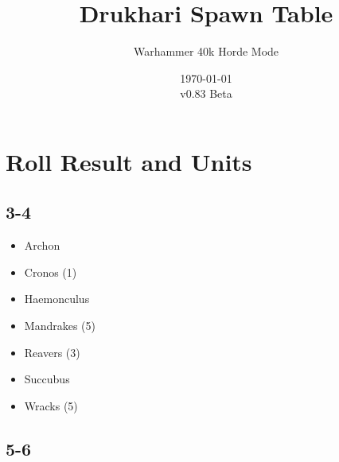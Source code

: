\documentclass{HordeModeTarot}
\title{Drukhari Spawn Table}
\author{Warhammer 40k Horde Mode}
\date{\today \\v0.83 Beta}
\begin{document}
\maketitle

\outputUsingSpawnTableBoilerplate
\section{Roll Result and Units}\hypertarget{roll-results}{}\label{roll-results}

\begin{multicols}{2}

\subsection*{3-4}

\begin{itemize}[leftmargin=*]
\item[] Archon
\item[] Cronos (1)
\item[] Haemonculus
\item[] Mandrakes (5)
\item[] Reavers (3)
\item[] Succubus
\item[] Wracks (5)
\end{itemize}

\subsection*{5-6}


\end{multicols}
\end{document}
